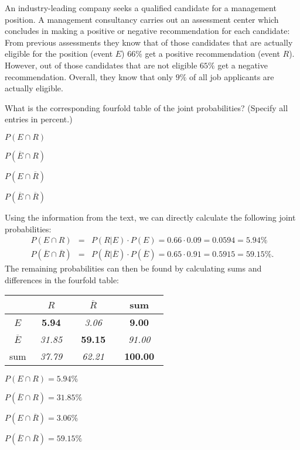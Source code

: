 

\begin{question}
An industry-leading company seeks a qualified candidate for a management position.
A management consultancy carries out an assessment center which concludes in making
a positive or negative recommendation for each candidate: From previous assessments they know that
of those candidates that are actually eligible for the position (event $E$) $66\%$
get a positive recommendation (event $R$). However, out of those candidates that are not eligible
$65\%$ get a negative recommendation. Overall, they know that only
$9\%$ of all job applicants are actually eligible.

What is the corresponding fourfold table of the joint probabilities? (Specify all entries in percent.)

\begin{answerlist}
  \item $P(E \cap R)$
  \item $P(\overline{E} \cap R)$
  \item $P(E \cap \overline{R})$
  \item $P(\overline{E} \cap \overline{R})$
\end{answerlist}
\end{question}


\begin{solution}
Using the information from the text, we can directly calculate the following joint probabilities:
\begin{eqnarray*}
  P(E \cap R) & = &
    P(R | E) \cdot P(E) = 0.66 \cdot 0.09 = 0.0594 = 5.94\%\\
  P(\overline{E} \cap \overline{R}) & = &
    P(\overline{R} | \overline{E}) \cdot P(\overline{E}) = 0.65 \cdot 0.91 = 0.5915 = 59.15\%.
\end{eqnarray*}
The remaining probabilities can then be found by calculating sums and differences in the fourfold table:

\begin{tabular}{|c|cc|c|}
\hline
                 & ~$R$~                    & ~$\overline{R}$~         & sum \\ \hline
~$E$~            & ~{\bf   5.94}~ & ~{\it   3.06}~ & ~{\bf   9.00}~ \\
~$\overline{E}$~ & ~{\it  31.85}~ & ~{\bf  59.15}~ & ~{\it  91.00}~ \\ \hline
sum              & ~{\it  37.79}~ & ~{\it  62.21}~ & ~{\bf 100.00}~ \\
\hline
\end{tabular}

\begin{answerlist}
  \item $P(E \cap R) =  5.94\%$
  \item $P(\overline{E} \cap R) = 31.85\%$
  \item $P(E \cap \overline{R}) =  3.06\%$
  \item $P(\overline{E} \cap \overline{R}) = 59.15\%$
\end{answerlist}
\end{solution}



